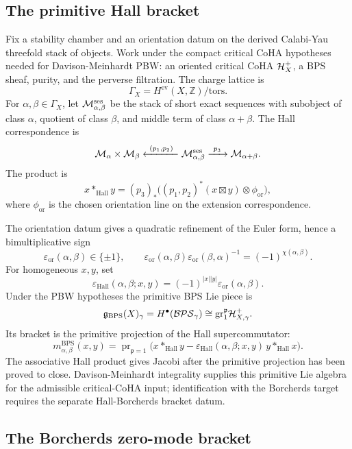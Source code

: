 \subsection*{The primitive Hall bracket}

Fix a stability chamber and an orientation datum on the derived
Calabi-Yau threefold stack of objects.  Work under the compact critical
CoHA hypotheses needed for Davison-Meinhardt PBW: an oriented critical
CoHA \(\mathcal H^+_X\), a BPS sheaf, purity, and the perverse filtration.
The charge lattice is
\[
  \Gamma_X=H^{\mathrm{ev}}(X,\mathbb Z)/\mathrm{tors}.
\]
For \(\alpha,\beta\in\Gamma_X\), let
\(\mathcal M_{\alpha,\beta}^{\mathrm{ses}}\) be the stack of short exact
sequences with subobject of class \(\alpha\), quotient of class
\(\beta\), and middle term of class \(\alpha+\beta\).  The Hall
correspondence is
\[
  \mathcal M_\alpha\times\mathcal M_\beta
  \xleftarrow{\ (p_1,p_2)\ }
  \mathcal M_{\alpha,\beta}^{\mathrm{ses}}
  \xrightarrow{\ p_3\ }
  \mathcal M_{\alpha+\beta}.
\]
The product is
\[
  x *_\mathrm{Hall} y
  =
  (p_3)_*
  \bigl((p_1,p_2)^*(x\boxtimes y)\otimes\phi_{\mathrm{or}}\bigr),
\]
where \(\phi_{\mathrm{or}}\) is the chosen orientation line on the
extension correspondence.

The orientation datum gives a quadratic refinement of the Euler form,
hence a bimultiplicative sign
\[
  \varepsilon_{\mathrm{or}}(\alpha,\beta)
  \in\{\pm1\},\qquad
  \varepsilon_{\mathrm{or}}(\alpha,\beta)
  \varepsilon_{\mathrm{or}}(\beta,\alpha)^{-1}
  =
  (-1)^{\chi(\alpha,\beta)} .
\]
For homogeneous \(x,y\), set
\[
  \varepsilon_{\mathrm{Hall}}(\alpha,\beta;x,y)
  =
  (-1)^{|x||y|}\varepsilon_{\mathrm{or}}(\alpha,\beta).
\]
Under the PBW hypotheses the primitive BPS Lie piece is
\[
  \mathfrak{g}_{\mathrm{BPS}}(X)_\gamma
  =
  H^\bullet(\mathcal{BPS}_\gamma)
  \cong
  \mathrm{gr}^{\mathfrak p}_1\mathcal H^+_{X,\gamma}.
\]
Its bracket is the primitive projection of the Hall supercommutator:
\[
  m^{\mathrm{BPS}}_{\alpha,\beta}(x,y)
  =
  \operatorname{pr}_{\mathfrak p=1}
  \bigl(
    x *_\mathrm{Hall} y
    -
    \varepsilon_{\mathrm{Hall}}(\alpha,\beta;x,y)\,
    y *_\mathrm{Hall} x
  \bigr).
\]
The associative Hall product gives Jacobi after the primitive
projection has been proved to close.  Davison-Meinhardt integrality
supplies this primitive Lie algebra for the admissible critical-CoHA
input; identification with the Borcherds target requires the separate
Hall-Borcherds bracket datum.

\subsection*{The Borcherds zero-mode bracket}

